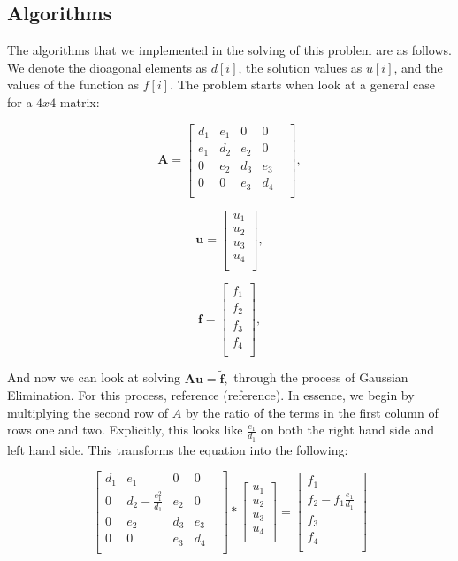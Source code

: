 \documentclass{article}
\begin{document}
\subsection{Algorithms}
The algorithms that we implemented in the solving of this problem are as follows. We denote the dioagonal elements as $d[i]$, the solution values as $u[i]$, and the values of the function as $f[i]$. The problem starts when look at a general case for a $4x4$ matrix:

\[
\mathbf{A} = \begin{bmatrix}
d_{1}& e_{1}& 0& 0& \\
e_{1}& d_{2}& e_{2}& 0& \\
0& e_{2}& d_{3}& e_{3}& \\
0& 0& e_{3}& d_{4}& \\

\end{bmatrix},
\]

\[
\mathbf{u} = \begin{bmatrix}
u_{1}\\
u_{2} \\
u_{3}\\
u_{4}\\
\end{bmatrix},
\]

\[
\mathbf{f} = \begin{bmatrix}
f_{1}\\
f_{2} \\
f_{3}\\
f_{4}\\
\end{bmatrix},
\]

And now we can look at solving $\mathbf{A}\mathbf{u} = \tilde{\mathbf{f}},$ through the process of Gaussian Elimination. For this process, reference (reference). In essence, we begin by multiplying the second row of $A$ by the ratio of the terms in the first column of rows one and two. Explicitly, this looks like $\frac{e_{1}}{d_{1}}$ on both the right hand side and left hand side. This transforms the equation into the following: 

\[
\begin{bmatrix}
d_{1}& e_{1}& 0& 0& \\
0& d_{2}-\frac{e_{1}^{2}}{d_{1}}& e_{2}& 0& \\
0& e_{2}& d_{3}& e_{3}& \\
0& 0& e_{3}& d_{4}& \\
\end{bmatrix}
*
\begin{bmatrix}
u_{1}\\
u_{2} \\
u_{3}\\
u_{4}\\
\end{bmatrix}
=
\begin{bmatrix}
f_{1}\\
f_{2} - f_{1} \frac{e_{1}}{d_{1}} \\
f_{3}\\
f_{4}\\
\end{bmatrix}
\]
\end{document}
